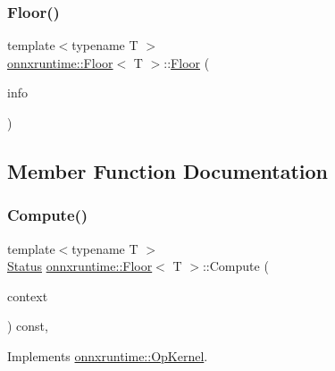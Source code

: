 \subsubsection{\texorpdfstring{Floor()}{Floor()}}
{\footnotesize\ttfamily template$<$typename T $>$ \\
\mbox{\hyperlink{classonnxruntime_1_1Floor}{onnxruntime\+::\+Floor}}$<$ T $>$\+::\mbox{\hyperlink{classonnxruntime_1_1Floor}{Floor}} (\begin{DoxyParamCaption}\item[{const \mbox{\hyperlink{classonnxruntime_1_1OpKernelInfo}{Op\+Kernel\+Info}} \&}]{info }\end{DoxyParamCaption})\hspace{0.3cm}{\ttfamily [inline]}}



\subsection{Member Function Documentation}
\mbox{\label{classonnxruntime_1_1Floor_a76529818dfe33e06fca8aa32d6c40d93}} 
\subsubsection{\texorpdfstring{Compute()}{Compute()}\hspace{0.1cm}{\footnotesize\ttfamily [1/2]}}
{\footnotesize\ttfamily template$<$typename T $>$ \\
\mbox{\hyperlink{classonnxruntime_1_1common_1_1Status}{Status}} \mbox{\hyperlink{classonnxruntime_1_1Floor}{onnxruntime\+::\+Floor}}$<$ T $>$\+::Compute (\begin{DoxyParamCaption}\item[{\mbox{\hyperlink{classonnxruntime_1_1OpKernelContext}{Op\+Kernel\+Context}} $\ast$}]{context }\end{DoxyParamCaption}) const\hspace{0.3cm}{\ttfamily [override]}, {\ttfamily [virtual]}}



Implements \mbox{\hyperlink{classonnxruntime_1_1OpKernel_a9eca8656a78b1b3ab9d3351a12798650}{onnxruntime\+::\+Op\+Kernel}}.

\mbox{\label{classonnxruntime_1_1Floor_a1cd580a5b6c87c16122ece54ac9a9b02}} 
